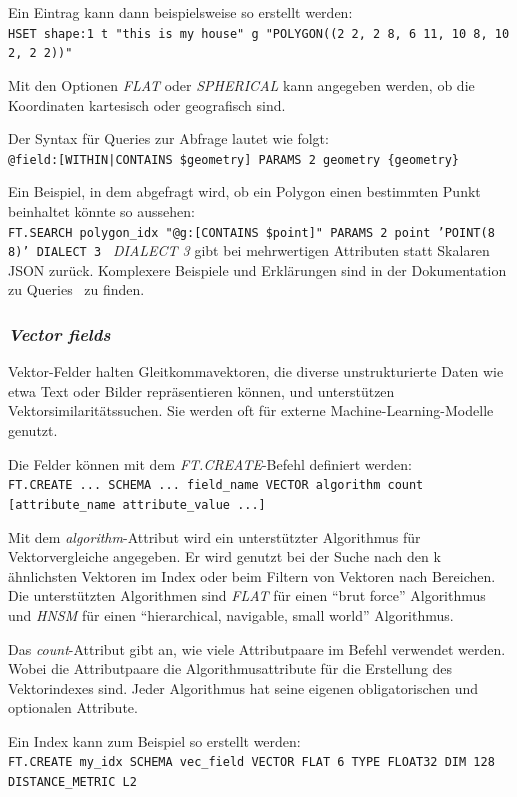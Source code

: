 Ein Eintrag kann dann beispielsweise so erstellt werden:\\
\texttt{HSET shape:1 t "this is my house" g "POLYGON((2 2, 2 8, 6 11, 10 8, 10 2, 2 2))"}


Mit den Optionen \emph{FLAT} oder \emph{SPHERICAL} kann angegeben werden, ob die Koordinaten kartesisch  oder  geografisch sind.

Der Syntax für Queries zur Abfrage lautet wie folgt:\\
\texttt{@field:[{WITHIN|CONTAINS} \$geometry] PARAMS 2 geometry \{geometry\}}

Ein Beispiel, in dem abgefragt wird, ob ein Polygon einen bestimmten Punkt beinhaltet könnte so aussehen:\\
\texttt{FT.SEARCH polygon\_idx "@g:[CONTAINS \$point]" PARAMS 2 point 'POINT(8 8)' DIALECT 3
}
\emph{DIALECT 3} gibt bei mehrwertigen Attributen statt Skalaren JSON zurück.
Komplexere Beispiele und Erklärungen sind in der Dokumentation zu Queries~\cite{redis_ltd_query_nodate} zu finden.


\subsubsection{\emph{Vector fields}} Vektor-Felder halten Gleitkommavektoren, die diverse unstrukturierte Daten wie etwa Text oder Bilder repräsentieren können, und unterstützen Vektorsimilaritätssuchen. Sie werden oft für externe Machine-Learning-Modelle genutzt.

Die Felder können mit dem \emph{FT.CREATE}-Befehl definiert werden:\\
\texttt{FT.CREATE ... SCHEMA ... {field\_name} VECTOR {algorithm} {count} [{attribute\_name} {attribute\_value} ...]
}

Mit dem \emph{algorithm}-Attribut wird ein unterstützter Algorithmus für Vektorvergleiche angegeben. Er wird genutzt bei der Suche nach den k ähnlichsten Vektoren im Index oder beim Filtern von Vektoren nach Bereichen. Die unterstützten Algorithmen sind \emph{FLAT} für einen \enquote{brut force} Algorithmus und \emph{HNSM} für einen \enquote{hierarchical, navigable, small world} Algorithmus.

Das \emph{count}-Attribut gibt an, wie viele Attributpaare im Befehl verwendet werden. Wobei die Attributpaare die Algorithmusattribute für die Erstellung des Vektorindexes sind. Jeder Algorithmus hat seine eigenen obligatorischen und optionalen Attribute.

Ein Index kann zum Beispiel so erstellt werden:\\
\texttt{FT.CREATE my\_idx SCHEMA vec\_field VECTOR FLAT 6 TYPE FLOAT32 DIM 128 DISTANCE\_METRIC L2}

